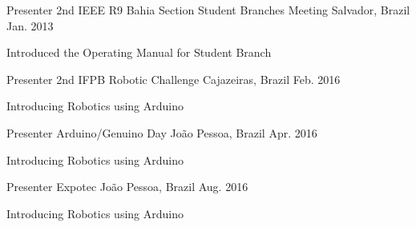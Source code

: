 

\begin{cventries}

  \cventry
    {Presenter} %
    {2nd IEEE R9 Bahia Section Student Branches Meeting} %
    {Salvador, Brazil} %
    {Jan. 2013} %
    {
      \begin{cvitems} %
        \item {Introduced the Operating Manual for Student Branch}
      \end{cvitems}
    }

  \cventry
    {Presenter} %
    {2nd IFPB Robotic Challenge} %
    {Cajazeiras, Brazil} %
    {Feb. 2016} %
    {
      \begin{cvitems} %
        \item {Introducing Robotics using Arduino}
      \end{cvitems}
    }


  \cventry
    {Presenter} %
    {Arduino/Genuino Day} %
    {João Pessoa, Brazil} %
    {Apr. 2016} %
    {
      \begin{cvitems} %
        \item {Introducing Robotics using Arduino}
      \end{cvitems}
    }

  \cventry
    {Presenter} %
    {Expotec} %
    {João Pessoa, Brazil} %
    {Aug. 2016} %
    {
      \begin{cvitems} %
        \item {Introducing Robotics using Arduino}
      \end{cvitems}
    }

\end{cventries}

